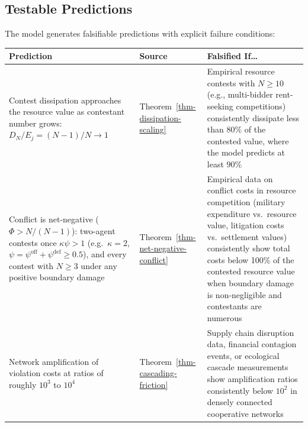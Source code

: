 \documentclass[11pt]{article}
\theoremstyle{plain}
\theoremstyle{definition}
\theoremstyle{remark}
\newcounter{none}
\let\origsubsection\subsection
\renewcommand{\subsection}{\needspace{7\baselineskip}\origsubsection}
\begin{document}
\subsection{Testable Predictions}\label{testable-predictions}

The model generates falsifiable predictions with explicit failure
conditions:

{\def\LTcaptype{none} %
\begin{longtable}[]{@{}
  >{\raggedright\arraybackslash}p{}
  >{\raggedright\arraybackslash}p{}
  >{\raggedright\arraybackslash}p{}@{}}
\toprule\noalign{}
\begin{minipage}[b]{\linewidth}\raggedright
Prediction
\end{minipage} & \begin{minipage}[b]{\linewidth}\raggedright
Source
\end{minipage} & \begin{minipage}[b]{\linewidth}\raggedright
Falsified If\ldots{}
\end{minipage} \\
\midrule\noalign{}
\endhead
\bottomrule\noalign{}
\endlastfoot
Contest dissipation approaches the resource value as contestant number
grows: \(D_N/E_j = (N-1)/N \to 1\) &
Theorem~\ref{thm-dissipation-scaling} & Empirical resource contests with
\(N \geq 10\) (e.g., multi-bidder rent-seeking competitions)
consistently dissipate less than \(80\%\) of the contested value, where
the model predicts at least \(90\%\) \\
Conflict is net-negative (\(\Phi > N/(N-1)\)): two-agent contests once
\(\kappa\psi > 1\) (e.g.~\(\kappa = 2\),
\(\psi = \psi^{\text{off}} + \psi^{\text{def}} \geq 0.5\)), and every
contest with \(N \geq 3\) under any positive boundary damage &
Theorem~\ref{thm-net-negative-conflict} & Empirical data on conflict
costs in resource competition (military expenditure vs.~resource value,
litigation costs vs.~settlement values) consistently show total costs
below 100\% of the contested resource value when boundary damage is
non-negligible and contestants are numerous \\
Network amplification of violation costs at ratios of roughly \(10^3\)
to \(10^4\) & Theorem~\ref{thm-cascading-friction} & Supply chain
disruption data, financial contagion events, or ecological cascade
measurements show amplification ratios consistently below \(10^2\) in
densely connected cooperative networks \\

\end{longtable}}
\end{document}
